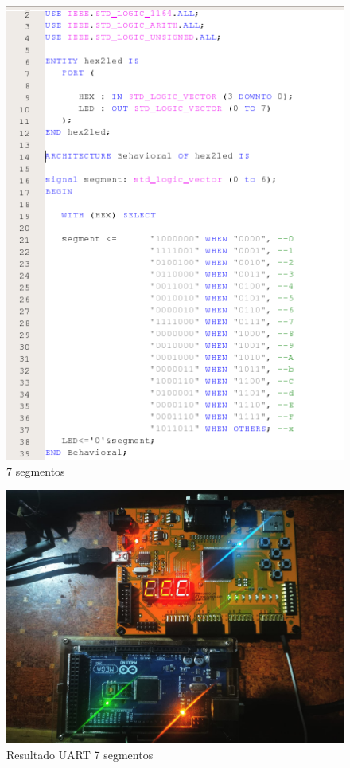 \documentclass[journal]{IEEEtran}
\begin{document}
\begin{figure}[H]
    \centering
    \includegraphics[scale=0.4]{images/7segment.png}
    \caption{7 segmentos}
\end{figure}


\begin{figure}[H]
    \centering
    \includegraphics[scale=0.1]{images/WhatsApp Image 2023-10-01 at 3.32.39 AM.jpeg}
    \caption{Resultado UART 7 segmentos}
\end{figure}
\end{document}
